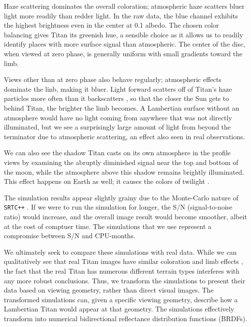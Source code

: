 \documentclass[twocolumn,linenumbers]{aastex631}
\def\srtcppspace{{\tt SRTC++} }
\begin{document}
Haze scattering dominates the overall coloration; atmospheric haze scatters bluer light more readily than redder light. In the raw data, the blue channel exhibits the highest brightness even in the center at 0.1 albedo. The chosen color balancing gives Titan its greenish hue, a sensible choice as it allows us to readily identify places with more surface signal than atmospheric. The center of the disc, when viewed at zero phase, is generally uniform with small gradients toward the limb. 

Views other than at zero phase also behave regularly; atmospheric effects dominate the linb, making it bluer. Light forward scatters off of Titan's haze particles more often than it backscatters \citep{GarcaMuoz2017, Cooper2025}, so that the closer the Sun gets to behind Titan, the brighter the limb becomes. A Lambertian surface without an atmosphere would have no light coming from anywhere that was not directly illuminated, but we see a surprisingly large amount of light from beyond the terminator due to atmospheric scattering, an effect also seen in real observations.

We can also see the shadow Titan casts on its own atmosphere in the profile views by examining the abruptly diminished signal near the top and bottom of the moon, while the atmosphere above this shadow remains brightly illuminated. This effect happens on Earth as well; it causes the colors of twilight \citep{Lynch2004}.

The simulation results appear slightly grainy due to the Monte-Carlo nature of \srtcppspace. If we were to run the simulation for longer, the S/N (signal-to-noise ratio) would increase, and the overall image result would become smoother, albeit at the cost of comptuer time. The simulations that we use represent a compromise between S/N and CPU-months.

We ultimately seek to compare these simulations with real data. While we can qualitatively see that real Titan images have similar coloration and limb effects \citep{Barnes2005}, the fact that the real Titan has numerous different terrain types interferes with any more robust conclusions. Thus, we transform the simulations to present their data based on viewing geometry, rather than direct visual images. The transformed simulations can, given a specific viewing geometry, describe how a Lambertian Titan would appear at that geometry. The simulations effectively transform into numerical bidirectional reflectance distribution functions (BRDFs).
\end{document}
